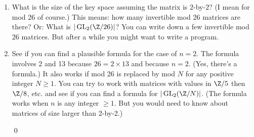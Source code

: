   \mbox{}
  \begin{enumerate}[nosep]
  \item
    What is the size of the key space assuming the matrix is $2$-by-$2$? (I mean
    for mod 26 of course.)
    This means: how many invertible mod 26 matrices are there?
    Or: What is $|\operatorname{GL}_2(\Z/26)|$?
    You can write down a few invertible mod 26 matrices.
    But after a while you might want to
    write a program.

  \item
    See if you can find a plausible formula for the case of
    $n = 2$. The formula involves 2 and 13 because
    $26 = 2 \times 13$ and because $n = 2$.
    (Yes, there's a formula.)
    It also works if mod 26 is replaced by mod $N$ for any positive
    integer $N \geq 1$. You can try to work with matrices with values in
    $\Z/5$ then $\Z/8$, etc. and see if you can find a formula for
    $|\operatorname{GL}_2(\Z/N)|$.
    (The formula works when $n$ is any integer $\geq 1$. But you would
    need to know about matrices of size larger than 2-by-2.)

    \qed
  \end{enumerate}
